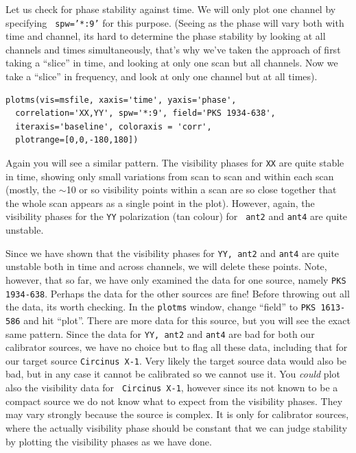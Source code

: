 \documentclass[force,almostfull,justified]{tufte-book}
\begin{document}
Let us check for phase stability against time.  We will only plot one channel by specifying {\tt
spw='*:9'} for this purpose.  (Seeing as the phase will vary both with time and channel, its hard to
determine the phase stability by looking at all channels and times simultaneously, that's why we've
taken the approach of first taking a ``slice'' in time, and looking at only one scan but all channels.
Now we take a ``slice'' in frequency, and look at only one channel but at all times).

\begin{casacmd}
\begin{verbatim}
plotms(vis=msfile, xaxis='time', yaxis='phase',
  correlation='XX,YY', spw='*:9', field='PKS 1934-638',
  iteraxis='baseline', coloraxis = 'corr',
  plotrange=[0,0,-180,180])
\end{verbatim}
\end{casacmd}

Again you will see a similar pattern.  The visibility phases for {\tt XX} are quite stable in time,
showing only small variations from scan to scan and within each scan (mostly, the $\sim$10 or so
visibility points within a scan are so close together that the whole scan appears as a single point in
the plot).  However, again, the visibility phases for the {\tt YY} polarization (tan colour) for {\tt
ant2} and {\tt ant4} are quite unstable.

Since we have shown that the visibility phases for {\tt YY, ant2} and {\tt ant4} are quite unstable
both in time and across channels, we will delete these points.  Note, however, that so far, we have
only examined the data for one source, namely {\tt PKS 1934-638}.  Perhaps the data for the other
sources are fine!  Before throwing out all the data, its worth checking.  In the {\tt plotms} window,
change ``field'' to {\tt PKS 1613-586} and hit ``plot''.  There are more data for this source, but you
will see the exact same pattern.  Since the data for {\tt YY, ant2} and {\tt ant4} are bad for both
our calibrator sources, we have no choice but to flag all these data, including that for our target
source {\tt Circinus X-1}.  Very likely the target source data would also be bad, but in any case it
cannot be calibrated so we cannot use it.  You {\em could} plot also the visibility data for {\tt
Circinus X-1}, however since its not known to be a compact source we do not know what to expect from
the visibility phases.  They may vary strongly because the source is complex.  It is only for
calibrator sources, where the actually visibility phase should be constant that we can judge stability
by plotting the visibility phases as we have done.
\end{document}
